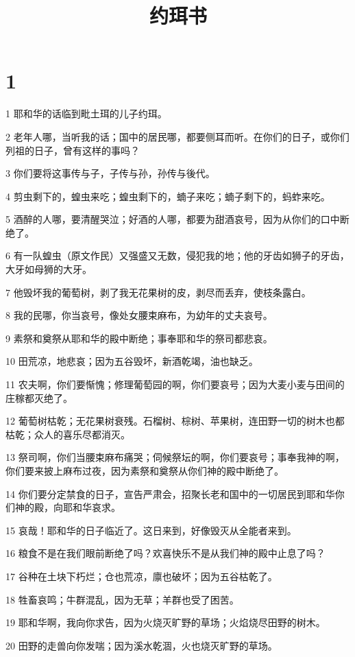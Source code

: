 

\title{约珥书}


\chapter{1}

\par 1 耶和华的话临到毗土珥的儿子约珥。
\par 2 老年人哪，当听我的话；国中的居民哪，都要侧耳而听。在你们的日子，或你们列祖的日子，曾有这样的事吗？
\par 3 你们要将这事传与子，子传与孙，孙传与後代。
\par 4 剪虫剩下的，蝗虫来吃；蝗虫剩下的，蝻子来吃；蝻子剩下的，蚂蚱来吃。
\par 5 酒醉的人哪，要清醒哭泣；好酒的人哪，都要为甜酒哀号，因为从你们的口中断绝了。
\par 6 有一队蝗虫（原文作民）又强盛又无数，侵犯我的地；他的牙齿如狮子的牙齿，大牙如母狮的大牙。
\par 7 他毁坏我的葡萄树，剥了我无花果树的皮，剥尽而丢弃，使枝条露白。
\par 8 我的民哪，你当哀号，像处女腰束麻布，为幼年的丈夫哀号。
\par 9 素祭和奠祭从耶和华的殿中断绝；事奉耶和华的祭司都悲哀。
\par 10 田荒凉，地悲哀；因为五谷毁坏，新酒乾竭，油也缺乏。
\par 11 农夫啊，你们要惭愧；修理葡萄园的啊，你们要哀号；因为大麦小麦与田间的庄稼都灭绝了。
\par 12 葡萄树枯乾；无花果树衰残。石榴树、棕树、苹果树，连田野一切的树木也都枯乾；众人的喜乐尽都消灭。
\par 13 祭司啊，你们当腰束麻布痛哭；伺候祭坛的啊，你们要哀号；事奉我神的啊，你们要来披上麻布过夜，因为素祭和奠祭从你们神的殿中断绝了。
\par 14 你们要分定禁食的日子，宣告严肃会，招聚长老和国中的一切居民到耶和华你们神的殿，向耶和华哀求。
\par 15 哀哉！耶和华的日子临近了。这日来到，好像毁灭从全能者来到。
\par 16 粮食不是在我们眼前断绝了吗？欢喜快乐不是从我们神的殿中止息了吗？
\par 17 谷种在土块下朽烂；仓也荒凉，廪也破坏；因为五谷枯乾了。
\par 18 牲畜哀鸣；牛群混乱，因为无草；羊群也受了困苦。
\par 19 耶和华啊，我向你求告，因为火烧灭旷野的草场；火焰烧尽田野的树木。
\par 20 田野的走兽向你发喘；因为溪水乾涸，火也烧灭旷野的草场。

